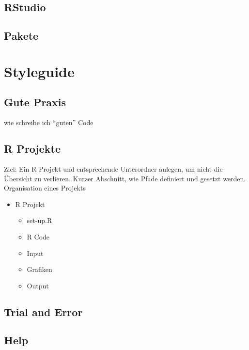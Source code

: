 \documentclass[
]{book}
\providecommand{\tightlist}{%
  \setlength{\itemsep}{0pt}\setlength{\parskip}{0pt}}
\begin{document}
\hypertarget{rstudio}{%
\section{RStudio}\label{rstudio}}

\hypertarget{pakete}{%
\section{Pakete}\label{pakete}}

\hypertarget{style}{%
\chapter{Styleguide}\label{style}}

\hypertarget{gute-praxis}{%
\section{Gute Praxis}\label{gute-praxis}}

wie schreibe ich ``guten'' Code

\hypertarget{r-projekte}{%
\section{R Projekte}\label{r-projekte}}

Ziel: Ein R Projekt und entsprechende Unterordner anlegen, um nicht die Übersicht zu verlieren. Kurzer Abschnitt, wie Pfade definiert und gesetzt werden.
Organisation eines Projekts

\begin{itemize}
\tightlist
\item
  R Projekt

  \begin{itemize}
  \tightlist
  \item
    set-up.R
  \item
    R Code
  \item
    Input
  \item
    Grafiken
  \item
    Output
  \end{itemize}
\end{itemize}

\hypertarget{trial-and-error}{%
\section{Trial and Error}\label{trial-and-error}}

\hypertarget{help}{%
\section{Help}\label{help}}
\end{document}
